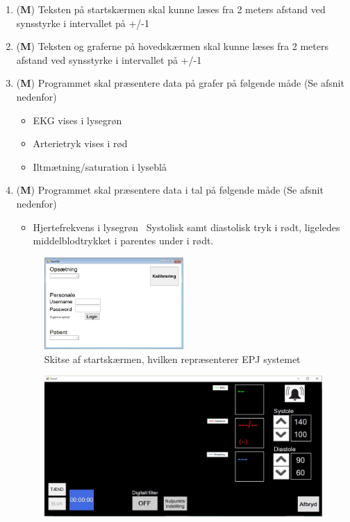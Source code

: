 \begin{enumerate}
\begin{enumerate}
\item (\textbf{M}) Teksten på startskærmen skal kunne læses fra 2 meters afstand ved synsstyrke i intervallet på +/-1
\item (\textbf{M}) Teksten og graferne på hovedskærmen skal kunne læses fra 2 meters afstand ved synsstyrke i intervallet på +/-1 
\item (\textbf{M}) Programmet skal præsentere data på grafer på følgende måde (Se afsnit nedenfor)
\begin{itemize}
\item EKG vises i lysegrøn
\item Arterietryk vises i rød
\item Iltmætning/saturation i lyseblå
\end{itemize}
\item (\textbf{M}) Programmet skal præsentere data i tal på følgende måde (Se afsnit nedenfor)
\begin{itemize}
\item Hjertefrekvens i lysegrøn
\ Systolisk samt diastolisk tryk i rødt, ligeledes middelblodtrykket i parentes under i rødt.
\end{itemize}
\begin{figure}[h!]
\includegraphics[width =0.5\textwidth , center]{billeder/skitseStart}
\caption{Skitse af startskærmen, hvilken repræsenterer EPJ systemet}
\end{figure}
\begin{figure}[h!]
\includegraphics[width =1.0\textwidth , center]{billeder/skitseHoved}

\end{figure}
\end{enumerate}
\end{enumerate}
